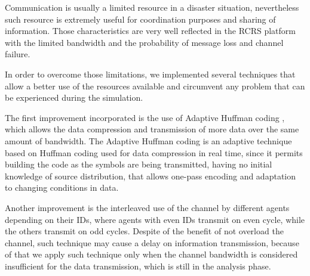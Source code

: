 Communication is usually a limited resource in a disaster situation, nevertheless such resource is extremely useful for coordination purposes and sharing of information. Those characteristics are very well reflected in the RCRS platform with the limited bandwidth and the probability of message loss and channel failure.

In order to overcome those limitations, we implemented several techniques that allow a better use of the resources available and circumvent any problem that can be experienced during the simulation.

The first improvement incorporated is the use of Adaptive Huffman coding \cite{vitter1987}, which allows the data compression and transmission of more data over the same amount of bandwidth. The Adaptive Huffman coding is an adaptive technique based on Huffman coding \cite{huffman1952} used for data compression in real time, since it permits building the code as the symbols are being transmitted, having no initial knowledge of source distribution, that allows one-pass encoding and adaptation to changing conditions in data.

Another improvement is the interleaved use of the channel by different agents depending on their IDs, where agents with even IDs transmit on even cycle, while the others transmit on odd cycles. Despite of the benefit of not overload the channel, such technique may cause a delay on information transmission, because of that we apply such technique only when the channel bandwidth is considered insufficient for the data transmission, which is still in the analysis phase.
